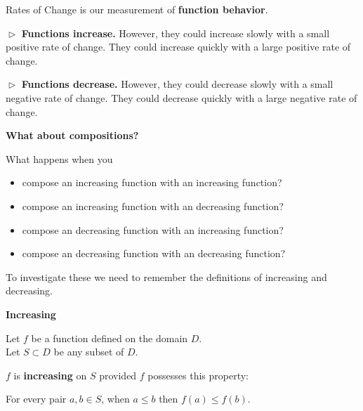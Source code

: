 \documentclass{ximera}
\begin{document}
Rates of Change is our measurement of \textbf{function behavior}.


$\vartriangleright$  \textbf{\textcolor{blue!55!black}{Functions increase.}}  However, they could increase slowly with a small positive rate of change.  They could increase quickly with a large positive rate of change. 



$\vartriangleright$  \textbf{\textcolor{blue!55!black}{Functions decrease.}}  However, they could decrease slowly with a small negative rate of change.  They could decrease quickly with a large negative rate of change. 





\textbf{\textcolor{purple!85!blue}{What about compositions?}}





What happens when you


\begin{itemize}
\item compose an increasing function with an increasing function?
\item compose an increasing function with an decreasing function?
\item compose an decreasing function with an increasing function?
\item compose an decreasing function with an decreasing function?
\end{itemize}



To investigate these we need to remember the definitions of increasing and decreasing.






\begin{idea} \textbf{\textcolor{blue!55!black}{Increasing}} 


Let $f$ be a function defined on the domain $D$. \\
Let $S \subset D$ be any subset of $D$.

$f$ is \textbf{increasing} on $S$ provided $f$ possesses this property:  


\begin{center}
For every pair $a, b \in S$, when $a \leq b$ then $f(a) \leq f(b)$.
\end{center}

\end{idea}
\end{document}
